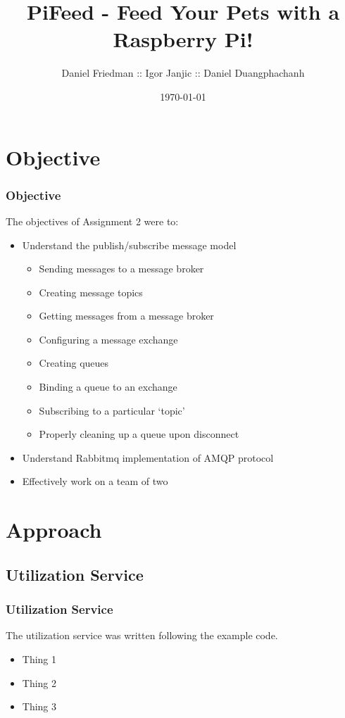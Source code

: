 \documentclass[]{beamer}
\title{PiFeed - Feed Your Pets with a Raspberry Pi!}
\author{Daniel Friedman :: Igor Janjic :: Daniel Duangphachanh}
\institute{Virginia Tech}
\date{\today}
\begin{document}
\begin{frame}
  \titlepage
\end{frame}
\note{}


\section{Objective}
\begin{frame}
	\frametitle{Objective}
    The objectives of Assignment 2 were to:
    \begin{itemize}
    	\item Understand the publish/subscribe message model
    	\begin{itemize}
        	\item Sending messages to a message broker
            \item Creating message topics
            \item Getting messages from a message broker
            \item Configuring a message exchange
            \item Creating queues
            \item Binding a queue to an exchange
            \item Subscribing to a particular ‘topic’
            \item Properly cleaning up a queue upon disconnect
        \end{itemize}
       
    	\item Understand Rabbitmq implementation of AMQP protocol
        \item Effectively work on a team of two
	\end{itemize}
\end{frame}



\section{Approach}
\subsection{Utilization Service}
\begin{frame}
	\frametitle{Utilization Service}
    The utilization service was written following the example code.
    \begin{itemize}
    	\item Thing 1
    	\item Thing 2
    	\item Thing 3
	\end{itemize}
\end{frame}
\end{document}
